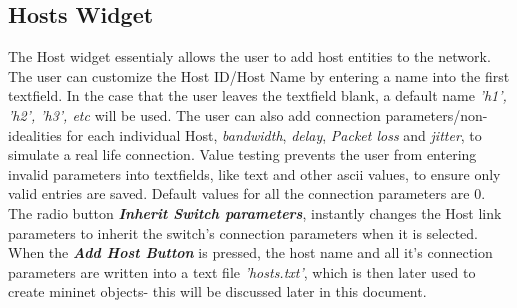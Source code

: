 \subsection{Hosts Widget}
The Host widget essentialy allows the user to add host entities to the network. The user can customize the Host ID/Host Name by entering a name into the first
textfield. In the case that the user leaves the textfield blank, a default name \textit{'h1', 'h2', 'h3', etc} will be used. The user can also add connection parameters/non-idealities for each individual Host, \textit{bandwidth}, \textit{delay}, \textit{Packet loss} and \textit{jitter}, to simulate a real life connection. Value testing prevents the user from entering invalid parameters into textfields, like text and other ascii values, to ensure only valid entries are saved. Default values for all the connection parameters are 0. The radio button \textbf{\textit{Inherit Switch parameters}}, instantly changes the Host link parameters to inherit the switch's connection parameters when it is selected. When the \textbf{\textit{Add Host Button} }is pressed, the host name and all it's connection parameters are written into a text file \textit{'hosts.txt'}, which is then later used to create mininet objects- this will be discussed later in this document.\\
